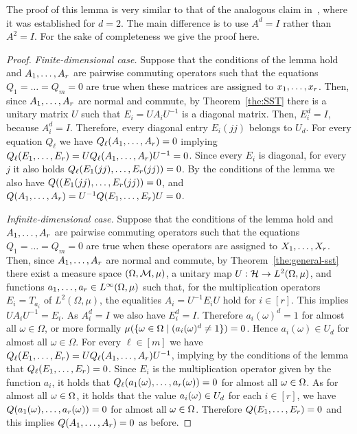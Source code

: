 \documentclass[11pt,letter]{article}
\begin{document}
The proof of this lemma is very similar to that of the analogous claim
in~\cite[Lemma~3]{AKS19:jcss}, where it was established for $d=2$.
The main difference is to 
use $A^d=I$ rather than $A^2=I$. For the sake of completeness we give the proof here.

\noindent\begin{proof}
{\it Finite-dimensional case.}
Suppose that the conditions of the lemma hold and $A _1,\ldots, A _{r}$ are pairwise
  commuting operators such that the equations $Q_1=\dots=Q_m=0$ are
  true when these matrices are assigned to $x _1,\ldots, x _{r}$. Then, since $A _1,\ldots, A _{r}$ are
  normal and commute, by Theorem~\ref{the:SST} there is a unitary matrix $U$
  such that $E_i=UA_iU^{-1}$ is a diagonal matrix. Then, $E_i^d=I$, because $A_i^d=I$. Therefore, every diagonal entry $E_i(jj)$ belongs to $U_d$. For every equation $Q_\ell$ we have $Q_\ell(A _1,\ldots, A _{r})=0$ implying
  $Q_\ell(E _1,\ldots, E _{r})=UQ_\ell(A _1,\ldots, A _{r})U^{-1}=0$. Since every $E_i$ is diagonal, for every $j$ it also holds $Q_\ell(E_1(jj),\ldots, E_r(jj))=0$. By the conditions of the lemma we also have $Q((E_1(jj),\ldots, E_r(jj))=0$, and $Q(A _1,\ldots, A _{r})=U^{-1}Q(E _1,\ldots, E _{r})U=0$.


\smallskip

{\it Infinite-dimensional case.}
Suppose that the conditions of the lemma hold and $A _1,\ldots, A _{r}$ are pairwise commuting  operators such that the equations $Q_1=\dots=Q_m=0$ are true when these operators are assigned to $X _1,\ldots, X _{r}$. Then, since $A _1,\ldots, A _{r}$ are normal and commute, by  Theorem~\ref{the:general-sst} there exist a measure space $(\Omega,{\mathcal M},\mu)$, a unitary map $U:{\mathcal H}\to L^2(\Omega,\mu)$, and functions $a _1,\ldots, a _{r}\in L^\infty(\Omega,\mu)$ such that, for the multiplication operators $E_i=T_{a_i}$ of $L^2(\Omega,\mu)$, the equalities $A_i=U^{-1}E_iU$ hold for $i\in[r]$. This implies $UA_iU^{-1}=E_i$. As $A_i^d=I$ we also have $E_i^d=I$. Therefore $a_i(\omega)^d=1$ for almost all $\omega\in\Omega$, or more formally $\mu(\{\omega\in\Omega\mid (a_i(\omega)^d\ne1\})=0$. Hence $a_i(\omega)\in U_d$ for almost all $\omega\in\Omega$. For every $\ell\in[m]$ we have $Q_\ell(E _1,\ldots, E _{r})=UQ_\ell(A _1,\ldots, A _{r})U^{-1}$, implying by the conditions of the lemma that $Q_\ell(E _1,\ldots, E _{r})=0$. Since $E_i$ is the multiplication operator given by the function $a_i$, it holds that $Q_\ell(a_1(\omega),\ldots, a_r(\omega))=0$ for almost all $\omega\in\Omega$. As for almost all $\omega\in\Omega$, it holds that the value $a_i(\omega)\in U_d$ for each $i\in[r]$, we have $Q(a_1(\omega),\ldots, a_r(\omega))=0$ for almost all $\omega\in\Omega$. Therefore $Q(E _1,\ldots, E _{r})=0$ and this implies $Q(A _1,\ldots, A _{r})=0$ as before.
\end{proof}
\end{document}
